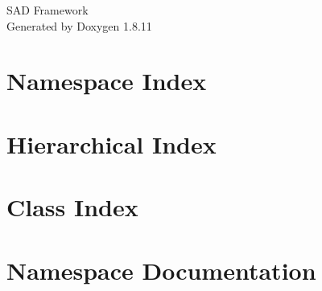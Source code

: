 \documentclass[twoside]{book}
\newcommand{\+}{\discretionary{\mbox{\scriptsize$\hookleftarrow$}}{}{}}
\newcommand{\clearemptydoublepage}{%
  \newpage{\pagestyle{empty}\cleardoublepage}%
}
\begin{document}
\hypersetup{pageanchor=false,
             bookmarksnumbered=true,
             pdfencoding=unicode
            }
\begin{titlepage}
\vspace*{7cm}
\begin{center}%
{\Large S\+AD Framework }\\
\vspace*{1cm}
{\large Generated by Doxygen 1.8.11}\\
\end{center}
\end{titlepage}
\clearemptydoublepage
\tableofcontents
\clearemptydoublepage
{}
\hypersetup{pageanchor=true}

\chapter{Namespace Index}

\chapter{Hierarchical Index}

\chapter{Class Index}

\chapter{Namespace Documentation}




















\end{document}
